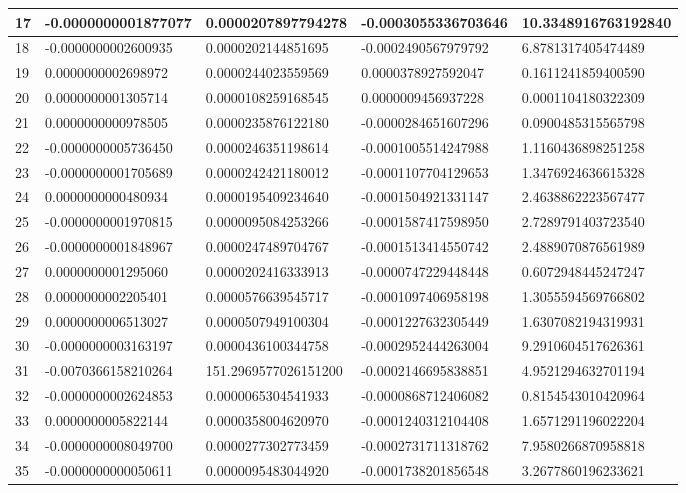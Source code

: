 \begin{center}
\begin{longtable}{|p{0.5cm}|p{3.5cm}|p{3.5cm}|p{3.5cm}|p{3.5cm}|}
\hline
17  & -0.0000000001877077  & 0.0000207897794278  & -0.0003055336703646  & 10.3348916763192840\\
\hline
18  & -0.0000000002600935  & 0.0000202144851695  & -0.0002490567979792  & 6.8781317405474489\\
\hline
19  & 0.0000000002698972  & 0.0000244023559569  & 0.0000378927592047  & 0.1611241859400590\\
\hline
20  & 0.0000000001305714  & 0.0000108259168545  & 0.0000009456937228  & 0.0001104180322309\\
\hline
21  & 0.0000000000978505  & 0.0000235876122180  & -0.0000284651607296  & 0.0900485315565798\\
\hline
22  & -0.0000000005736450  & 0.0000246351198614  & -0.0001005514247988  & 1.1160436898251258\\
\hline
23  & -0.0000000001705689  & 0.0000242421180012  & -0.0001107704129653  & 1.3476924636615328\\
\hline
24  & 0.0000000000480934  & 0.0000195409234640  & -0.0001504921331147  & 2.4638862223567477\\
\hline
25  & -0.0000000001970815  & 0.0000095084253266  & -0.0001587417598950  & 2.7289791403723540\\
\hline
26  & -0.0000000001848967  & 0.0000247489704767  & -0.0001513414550742  & 2.4889070876561989\\
\hline
27  & 0.0000000001295060  & 0.0000202416333913  & -0.0000747229448448  & 0.6072948445247247\\
\hline
28  & 0.0000000002205401  & 0.0000576639545717  & -0.0001097406958198  & 1.3055594569766802\\
\hline
29  & 0.0000000006513027  & 0.0000507949100304  & -0.0001227632305449  & 1.6307082194319931\\
\hline
30  & -0.0000000003163197  & 0.0000436100344758  & -0.0002952444263004  & 9.2910604517626361\\
\hline
31  & -0.0070366158210264  & 151.2969577026151200  & -0.0002146695838851  & 4.9521294632701194\\
\hline
32  & -0.0000000002624853  & 0.0000065304541933  & -0.0000868712406082  & 0.8154543010420964\\
\hline
33  & 0.0000000005822144  & 0.0000358004620970  & -0.0001240312104408  & 1.6571291196022204\\
\hline
34  & -0.0000000008049700  & 0.0000277302773459  & -0.0002731711318762  & 7.9580266870958818\\
\hline
35  & -0.0000000000050611  & 0.0000095483044920  & -0.0001738201856548  & 3.2677860196233621\\

\end{longtable}
\end{center}
